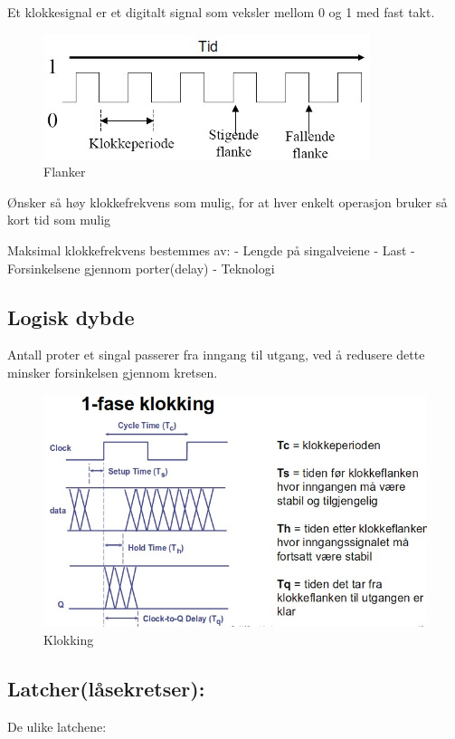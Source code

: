 \documentclass{article}
\begin{document}
	Et klokkesignal er et digitalt signal som veksler mellom 0 og 1 med fast takt. 
	
	\begin{figure}[H]
		\includegraphics[scale = 0.6]{flanke.jpg}
		\caption{Flanker}
	\end{figure}
	 
	Ønsker så høy klokkefrekvens som mulig, for at hver enkelt operasjon bruker så kort tid som mulig
	 
	Maksimal klokkefrekvens bestemmes av:
	 - Lengde på singalveiene
	 - Last
	 - Forsinkelsene gjennom porter(delay)
	 - Teknologi
	 
	\subsection*{Logisk dybde}
	Antall proter et singal passerer fra inngang til utgang, ved å redusere dette minsker forsinkelsen gjennom kretsen.
	
	\begin{figure}[H]
		\includegraphics[scale = 0.6]{klokking.jpg}
		\caption{Klokking}
	\end{figure}
	
	\subsection*{Latcher(låsekretser):}
	De ulike latchene:
	
\end{document}
